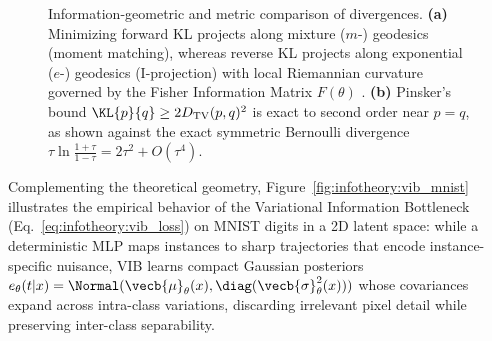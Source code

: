\documentclass[../../../../master.tex]{subfiles}
\begin{document}
\begin{figure}[htbp]
  \caption{Information-geometric and metric comparison of divergences. \textbf{(a)} Minimizing forward KL projects along mixture ($m$-) geodesics (moment matching), whereas reverse KL projects along exponential ($e$-) geodesics (I-projection) with local Riemannian curvature governed by the Fisher Information Matrix $F(\theta)$ . \textbf{(b)} Pinsker's bound $\KL{p}{q} \ge 2 D_{\mathrm{TV}}(p,q)^2$ is exact to second order near $p=q$, as shown against the exact symmetric Bernoulli divergence $\tau\ln\frac{1+\tau}{1-\tau} = 2\tau^2 + O(\tau^4)$.}
  \label{fig:infotheory:pinsker_manifold}
\end{figure}

Complementing the theoretical geometry, Figure~\ref{fig:infotheory:vib_mnist} illustrates the empirical behavior of the Variational Information Bottleneck (Eq.~\eqref{eq:infotheory:vib_loss}) on MNIST digits in a 2D latent space: while a deterministic MLP maps instances to sharp trajectories that encode instance-specific nuisance, VIB learns compact Gaussian posteriors $e_\theta(t|x) = \Normal(\vecb{\mu}_\theta(x), \diag(\vecb{\sigma}^2_\theta(x)))$ whose covariances expand across intra-class variations, discarding irrelevant pixel detail while preserving inter-class separability.
\end{document}
